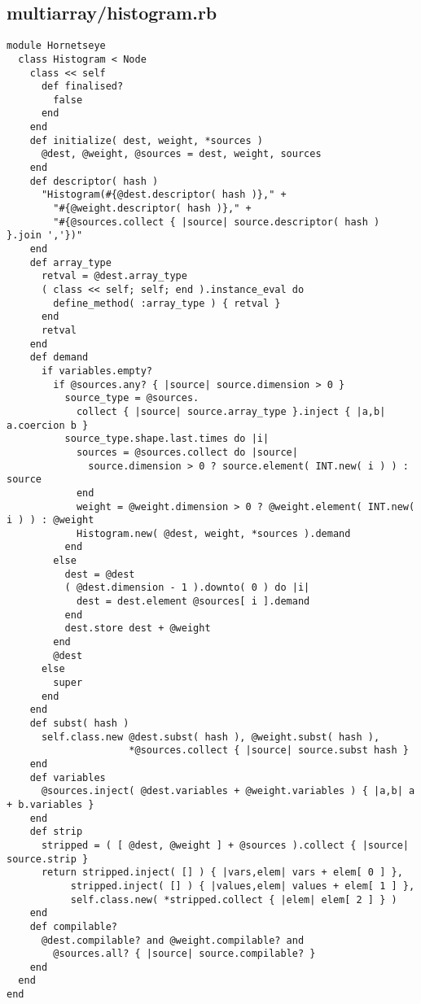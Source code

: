 \subsection{multiarray/histogram.rb}\label{cha:multiarray-histogram-rb}
\begin{lstlisting}
module Hornetseye
  class Histogram < Node
    class << self
      def finalised?
        false
      end
    end
    def initialize( dest, weight, *sources )
      @dest, @weight, @sources = dest, weight, sources
    end
    def descriptor( hash )
      "Histogram(#{@dest.descriptor( hash )}," +
        "#{@weight.descriptor( hash )}," +
        "#{@sources.collect { |source| source.descriptor( hash ) }.join ','})"
    end
    def array_type
      retval = @dest.array_type
      ( class << self; self; end ).instance_eval do
        define_method( :array_type ) { retval }
      end
      retval
    end
    def demand
      if variables.empty?
        if @sources.any? { |source| source.dimension > 0 }
          source_type = @sources.
            collect { |source| source.array_type }.inject { |a,b| a.coercion b }
          source_type.shape.last.times do |i|
            sources = @sources.collect do |source|
              source.dimension > 0 ? source.element( INT.new( i ) ) : source
            end
            weight = @weight.dimension > 0 ? @weight.element( INT.new( i ) ) : @weight
            Histogram.new( @dest, weight, *sources ).demand
          end
        else
          dest = @dest
          ( @dest.dimension - 1 ).downto( 0 ) do |i|
            dest = dest.element @sources[ i ].demand
          end
          dest.store dest + @weight
        end
        @dest
      else
        super
      end
    end
    def subst( hash )
      self.class.new @dest.subst( hash ), @weight.subst( hash ),
                     *@sources.collect { |source| source.subst hash }
    end
    def variables
      @sources.inject( @dest.variables + @weight.variables ) { |a,b| a + b.variables }
    end
    def strip
      stripped = ( [ @dest, @weight ] + @sources ).collect { |source| source.strip }
      return stripped.inject( [] ) { |vars,elem| vars + elem[ 0 ] },
           stripped.inject( [] ) { |values,elem| values + elem[ 1 ] },
           self.class.new( *stripped.collect { |elem| elem[ 2 ] } )
    end
    def compilable?
      @dest.compilable? and @weight.compilable? and
        @sources.all? { |source| source.compilable? }
    end
  end
end
\end{lstlisting}
